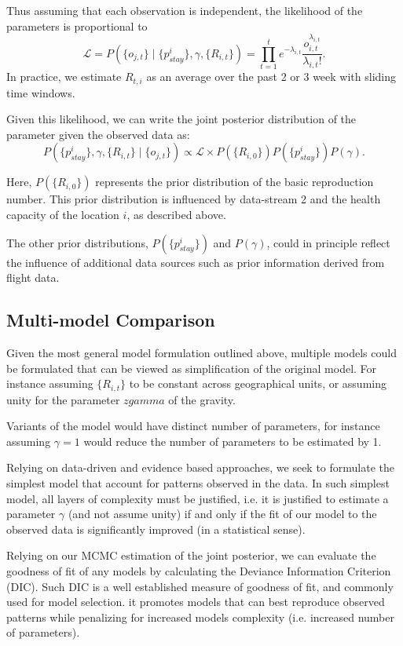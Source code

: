 \documentclass[11pt,]{article}
\begin{document}
Thus assuming that each observation is independent, the likelihood of the parameters is proportional to
\[
\mathcal{L} = P(\{o_{j, t}\} \mid \{p_{stay}^i\}, \gamma, \{R_{i, t}\}) = 
 \prod_{t = 1}^{t}{e^{-\lambda_{i, t}} \frac{o_{i, t}^{\lambda_{i, t}}}{\lambda_{i, t} !}}.
\]
In practice, we estimate $R_{t, i}$ as an average over the past 2 or 3 week with sliding time windows.

Given this likelihood, we can write the joint posterior distribution of the parameter given the observed data as:
\[
P( \{p_{stay}^i\}, \gamma, \{R_{i, t}\} \mid \{o_{j, t}\}) \propto  
  \mathcal{L} \times P(\{R_{i,0}\}) P(\{p_{stay}^i\}) P(\gamma).
\]

Here, $P(\{R_{i,0}\})$ represents the prior distribution of the basic reproduction number. This prior distribution is 
influenced by data-stream 2 and the health capacity of the location $i$, as described above.

The other prior distributions,  $P(\{p_{stay}^i\})$ and $P(\gamma)$, could in principle reflect the influence of 
additional data sources such as prior information derived from flight data. 

\subsection{Multi-model Comparison}

Given the most general model formulation outlined above, multiple models could be formulated that can be 
viewed as simplification of the original model. For instance assuming  $\{R_{i, t}\}$ to be constant across geographical units, 
or assuming unity for the parameter $zgamma$ of the gravity.

Variants of the model would have distinct number of parameters, for instance assuming $\gamma =1$ would reduce the number
of parameters to be estimated by 1. 

Relying on data-driven and evidence based approaches, we seek to formulate the 
simplest model that account for patterns observed in the data. In such simplest model, all layers of complexity must be justified, i.e.
it is justified to estimate a parameter $\gamma$ (and not assume unity) if and only if the fit of our model to the observed 
data is significantly improved (in a statistical sense).

Relying on our MCMC estimation of the joint posterior, we can evaluate the goodness of fit of any models by calculating
the Deviance Information Criterion (DIC). Such DIC is a well established measure of goodness of fit, and commonly 
used for model selection. it promotes models that can best reproduce observed patterns while penalizing
for increased models complexity (i.e. increased number of parameters).
\end{document}
